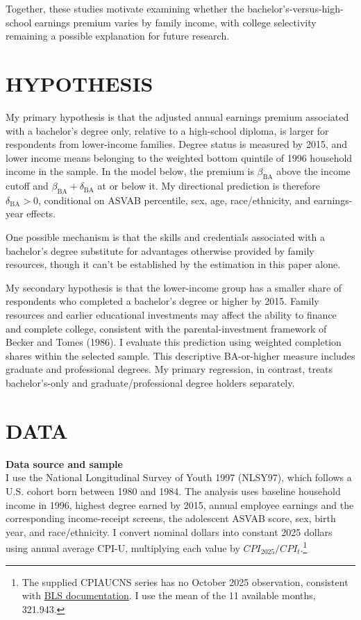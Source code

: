 \documentclass[12pt,letterpaper]{article}
\begin{document}
Together, these studies motivate examining whether the bachelor’s-versus-high-school 
earnings premium varies by family income, with college selectivity remaining a possible
 explanation for future research.

\section*{HYPOTHESIS}
My primary hypothesis is that the adjusted annual earnings premium associated with
a bachelor's degree only, relative to a high-school diploma, is larger for respondents
from lower-income families. Degree status is measured by 2015, and lower income
means belonging to the weighted bottom quintile of 1996 household income in the sample. 
In the model below, the premium is $\beta_{\mathrm{BA}}$ above the
income cutoff and $\beta_{\mathrm{BA}}+\delta_{\mathrm{BA}}$ at or below it.
My directional prediction is therefore $\delta_{\mathrm{BA}}>0$,
conditional on ASVAB percentile, sex, age, race/ethnicity, and earnings-year effects.\newline

One possible mechanism is that the skills and credentials associated with a
bachelor's degree substitute for advantages otherwise provided by family resources, 
though it can't be established by the estimation in this paper alone. \newline

My secondary hypothesis is that the lower-income group has a smaller share of
respondents who completed a bachelor's degree or higher by 2015. Family resources
and earlier educational investments may affect the ability to finance and complete
college, consistent with the parental-investment framework of Becker and Tomes
(1986). I evaluate this prediction using weighted completion shares within the
selected sample. This descriptive BA-or-higher measure includes graduate and
professional degrees. My primary regression, in contrast, treats bachelor's-only and
graduate/professional degree holders separately.\newline

\section*{DATA}
\textbf{Data source and sample}\\
I use the National Longitudinal Survey of Youth 1997 (NLSY97), which follows a
U.S. cohort born between 1980 and 1984. The analysis uses baseline household
income in 1996, highest degree earned
by 2015, annual employee earnings and the corresponding income-receipt screens,
the adolescent ASVAB score, sex, birth year, and race/ethnicity. I convert nominal dollars into constant 2025 dollars using annual average CPI-U,
multiplying each value by $CPI_{2025}/CPI_t$.\footnote{The supplied CPIAUCNS series
has no October 2025 observation, consistent with
\href{https://www.bls.gov/news.release/archives/cpi_12182025.htm}{BLS documentation}.
I use the mean of the 11 available months, 321.943.}\newline
\end{document}
